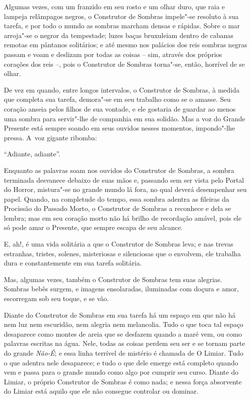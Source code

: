 
Algumas vezes, com um franzido em seu rosto e um olhar duro, que raia e
lampeja relâmpagos negros, o Construtor de Sombras impele"-se resoluto à
sua tarefa, e por todo o mundo as sombras marcham densas e rápidas.
Sobre o mar arroja"-se o negror da tempestade; luzes baças bruxuleiam
dentro de cabanas remotas em pântanos solitários; e até mesmo nos
palácios dos reis sombras negras passam e voam e deslizam por todas as
coisas -- sim, através dos próprios corações dos reis --, pois o
Construtor de Sombras torna"-se, então, horrível de se olhar.

De vez em quando, entre longos intervalos, o Construtor de Sombras, à
medida que completa sua tarefa, demora"-se em seu trabalho como se o
amasse. Seu coração anseia pelos filhos de sua vontade, e ele gostaria
de guardar ao menos uma sombra para servir"-lhe de companhia em sua
solidão. Mas a voz do Grande Presente está sempre soando em seus ouvidos
nesses momentos, impondo"-lhe pressa. A~voz gigante ribomba:

``Adiante, adiante''.

Enquanto as palavras soam nos ouvidos do Construtor de Sombras, a sombra
terminada desvanece debaixo de suas mãos e, passando sem ser vista pelo
Portal do Horror, mistura"-se no grande mundo lá fora, no qual deverá
desempenhar seu papel. Quando, na completude do tempo, essa sombra
adentra as fileiras da Procissão do Passado Morto, o Construtor de
Sombras a reconhece e dela se lembra; mas em seu coração morto não há
brilho de recordação amável, pois ele só pode amar o Presente, que
sempre escapa de seu alcance.

E, ah!, é uma vida solitária a que o Construtor de Sombras leva; e nas
trevas estranhas, tristes, solenes, misteriosas e silenciosas que o
envolvem, ele trabalha dura e constantemente em sua tarefa solitária.

Mas, algumas vezes, também o Construtor de Sombras tem suas alegrias.
Sombras bebês surgem, e imagens ensolaradas, iluminadas com doçura e
amor, escorregam sob seu toque, e se vão.

Diante do Construtor de Sombras em sua tarefa há um espaço em que não
há nem luz nem escuridão, nem alegria nem melancolia. Tudo o que toca
tal espaço desaparece como montes de areia que se desfazem quando a maré
vem, ou como palavras escritas na água. Nele, todas as coisas perdem seu
ser e se tornam parte do grande \emph{Não-É}; e essa linha terrível de
mistério é chamada de O Limiar. Tudo o que adentra nele desaparece; e
tudo o que dele emerge está completo quando vem e passa para o grande
mundo como algo por cumprir seu curso. Diante do Limiar, o próprio
Construtor de Sombras é como nada; e nessa força absorvente do Limiar
está aquilo que ele não consegue controlar ou dominar.


